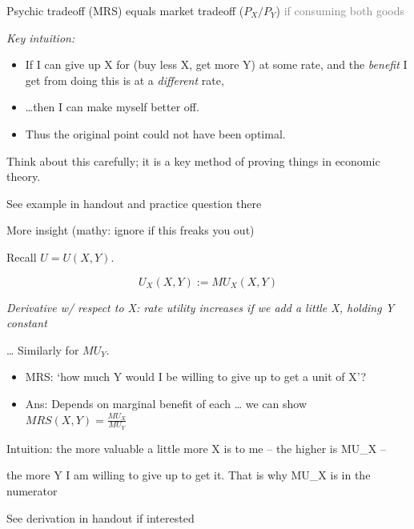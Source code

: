\documentclass[table]{beamer}
\providecommand{\tightlist}{%
  \setlength{\itemsep}{0pt}\setlength{\parskip}{0pt}}
\begin{document}
\begin{frame}

Psychic tradeoff (MRS) equals market tradeoff (\(P_X/P_Y\))
\textcolor{gray}{if consuming both goods}

\bigskip

\emph{Key intuition:}

\begin{itemize}[<+->]
\tightlist
\item
  If I can give up X for (buy less X, get more Y) at some rate, and the
  \emph{benefit} I get from doing this is at a \emph{different} rate,
\end{itemize}

\begin{itemize}[<+->]
\tightlist
\item
  \ldots then I can make myself better off.
\end{itemize}

\begin{itemize}[<+->]
\tightlist
\item
  Thus the original point could not have been optimal.
\end{itemize}

Think about this carefully; it is a key method of proving things in
economic theory.

See example in handout and practice question there

\end{frame}

\begin{frame}

\begin{block}{More insight (mathy: ignore if this freaks you out)}

Recall \(U=U(X,Y)\).

\[U_X(X,Y) := MU_X(X,Y)\]

\medskip

\emph{Derivative w/ respect to X: rate utility increases if we add a
little X, holding Y constant}

\ldots{} Similarly for \(MU_Y\).

\begin{itemize}[<+->]
\tightlist
\item
  MRS: `how much Y would I be willing to give up to get a unit of X'?
\end{itemize}

\begin{itemize}[<+->]
\tightlist
\item
  Ans: Depends on marginal benefit of each \ldots{} we can show
  \(MRS(X,Y)=\frac{MU_{X}}{MU_{Y}}\)
\end{itemize}

Intuition: the more valuable a little more X is to me -- the higher is
MU\_X --

the more Y I am willing to give up to get it. That is why MU\_X is in
the numerator

See derivation in handout if interested

\end{block}

\end{frame}
\end{document}
